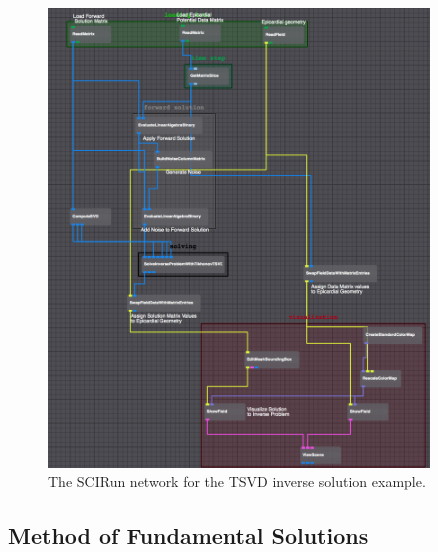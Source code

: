     \begin{figure}
        \begin{center}
        \includegraphics[width=0.9\textwidth]{ECGToolkitGuide_figures/TSVDNetwork.png}
        \caption{The SCIRun network for the TSVD inverse solution example.}
        \label{fig:TSVDNetworkExample}
        \end{center}
    \end{figure}




   
    
   
\subsection{Method of Fundamental Solutions}


